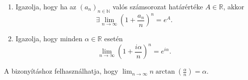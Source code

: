 \documentclass[11pt]{scrartcl}
\begin{document}
\begin{enumerate}
	\item Igazolja, hogy ha az $(a_n)_{n \in \mathbb{N}}$ valós számsorozat
	      határértéke $A \in \mathbb{R}$, akkor
	      \[
		      \exists \lim_{n \to \infty} \left(1 + \frac{a_n}{n}\right)^n
		      = e^A.
	      \]

	\item Igazolja, hogy minden $\alpha \in \mathbb{R}$ esetén
	      \[
		      \lim_{n \to \infty} \left(1 + \frac{i \alpha}{n}\right)^n
		      = e^{i \alpha}.
	      \]
\end{enumerate}
A bizonyításhoz felhasználhatja, hogy
$\lim_{n \to \infty} n \arctan\left(\frac{\alpha}{n}\right) = \alpha$.
\end{document}
